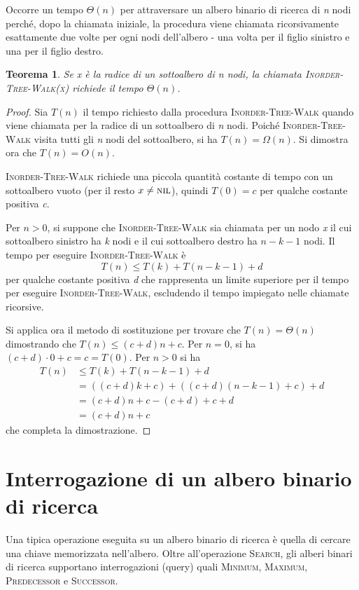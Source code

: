 \documentclass[10pt, a4paper]{report}
\newtheorem{theorem}{Teorema}[chapter]
\begin{document}
Occorre un tempo $\Theta(n)$ per attraversare un albero binario di ricerca di \textit{n} nodi perché, dopo la chiamata iniziale, la procedura viene chiamata ricorsivamente esattamente due volte per ogni nodi dell'albero - una volta per il figlio sinistro e una per il figlio destro.
\begin{theorem}
Se \textit{x} è la radice di un sottoalbero di \textit{n} nodi, la chiamata \textsc{Inorder-Tree-Walk(\textit{x})} richiede il tempo $\Theta(n)$.
\end{theorem}
\begin{proof}
Sia $T(n)$ il tempo richiesto dalla procedura \textsc{Inorder-Tree-Walk} quando viene chiamata per la radice di un sottoalbero di \textit{n} nodi. Poiché \textsc{Inorder-Tree-Walk} visita tutti gli \textit{n} nodi del sottoalbero, si ha $T(n) = \Omega(n)$. Si dimostra ora che $T(n) = O(n)$.

\textsc{Inorder-Tree-Walk} richiede una piccola quantità costante di tempo con un sottoalbero vuoto (per il resto $x \not= \textsc{nil}$), quindi $T(0) = c$ per qualche costante positiva \textit{c}.

Per $n > 0$, si suppone che \textsc{Inorder-Tree-Walk} sia chiamata per un nodo \textit{x} il cui sottoalbero sinistro ha \textit{k} nodi e il cui sottoalbero destro ha $n - k - 1$ nodi. Il tempo per eseguire \textsc{Inorder-Tree-Walk} è
\begin{equation*}
T(n) \leq T(k) + T(n - k - 1) + d 
\end{equation*}
per qualche costante positiva \textit{d} che rappresenta un limite superiore per il tempo per eseguire \textsc{Inorder-Tree-Walk}, escludendo il tempo impiegato nelle chiamate ricorsive.

Si applica ora il metodo di sostituzione per trovare che $T(n) = \Theta(n)$ dimostrando che $T(n) \leq (c + d)n + c$. Per $n = 0$, si ha $(c + d)\cdot 0 + c = c = T(0)$. Per $n > 0$ si ha
\begin{align*}
T(n) &\leq T(k) + T(n - k - 1) + d \\
&= ((c+ d)k + c) + ((c + d)(n - k - 1) + c) + d \\
&= (c + d)n + c - (c + d) + c + d \\
&=(c+ d)n + c
\end{align*}
che completa la dimostrazione.
\end{proof}
\section{Interrogazione di un albero binario di ricerca}
Una tipica operazione eseguita su un albero binario di ricerca è quella di cercare una chiave memorizzata nell'albero. Oltre all'operazione \textsc{Search}, gli alberi binari di ricerca supportano interrogazioni (query) quali \textsc{Minimum, Maximum, Predecessor} e \textsc{Successor}.
\end{document}
